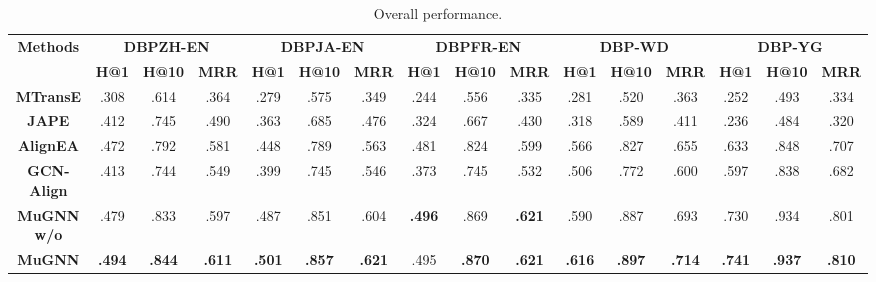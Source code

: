 \documentclass[11pt,a4paper]{article}
\begin{document}
\begin{table*}[htbp]
	\centering
	\small
	\setlength{\tabcolsep}{2.0pt}
	\begin{tabular}{cccccccccccccccc}
		\toprule
		\multirow{2}[4]{*}{\textbf{Methods}} & \multicolumn{3}{c}{\textbf{DBP\tiny{ZH-EN}}} & \multicolumn{3}{c}{\textbf{DBP\tiny{JA-EN}}} & \multicolumn{3}{c}{\textbf{DBP\tiny{FR-EN}}} & \multicolumn{3}{c}{\textbf{DBP-WD}} & \multicolumn{3}{c}{\textbf{DBP-YG}} \\
		\cmidrule{2-16}             & \textbf{H@1}            & \textbf{H@10}          & \textbf{MRR}            & \textbf{H@1}            & \textbf{H@10}           & \textbf{MRR}            & \textbf{H@1}            & \textbf{H@10}           & \textbf{MRR}      & \textbf{H@1}            & \textbf{H@10}           & \textbf{MRR}            & \textbf{H@1}            & \textbf{H@10}           & \textbf{MRR}            \\
		\midrule
		\textbf{MTransE}                     & .308          & .614          & .364          & .279          & .575          & .349          & .244          & .556          & .335          & .281          & .520          & .363          & .252          & .493          & .334          \\
		\textbf{JAPE}                        & .412          & .745          & .490          & .363          & .685          & .476          & .324          & .667          & .430          & .318          & .589          & .411          & .236          & .484          & .320          \\
		\textbf{AlignEA}                     & .472          & .792          & .581          & .448          & .789          & .563          & .481          & .824          & .599          & .566          & .827          & .655          & .633          & .848          & .707          \\
		\textbf{GCN-Align}                   & .413          & .744          & .549          & .399          & .745          & .546          & .373          & .745          & .532          & .506          & .772          & .600          & .597          & .838          & .682          \\
		\midrule
		\textbf{MuGNN w/o}  & .479          & .833          & .597          & .487          & .851          & .604          & \textbf{.496} & .869          & \textbf{.621} & .590          & .887          & .693          & .730          & .934          & .801          \\
\textbf{MuGNN}                       & \textbf{.494} & \textbf{.844} & \textbf{.611} & \textbf{.501} & \textbf{.857} & \textbf{.621} & .495          & \textbf{.870} & \textbf{.621} & \textbf{.616} & \textbf{.897} & \textbf{.714} & \textbf{.741} & \textbf{.937} & \textbf{.810} \\
		\bottomrule
	\end{tabular}\caption{Overall performance.}
	\label{tab:performance}\end{table*}
\end{document}
